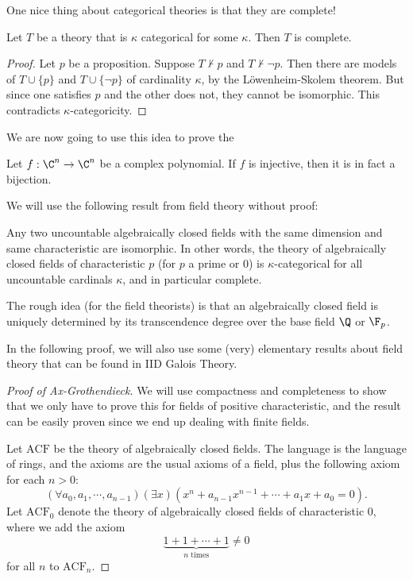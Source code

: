 \documentclass[a4paper]{article}
\begin{document}
\begin{own}
  One nice thing about categorical theories is that they are complete!
  \begin{prop}
    Let $T$ be a theory that is $\kappa$ categorical for some $\kappa$. Then $T$ is complete.
  \end{prop}

  \begin{proof}
    Let $p$ be a proposition. Suppose $T \not\vdash p$ and $T \not\vdash \neg p$. Then there are models of $T \cup \{p\}$ and $T \cup \{\neg p\}$ of cardinality $\kappa$, by the L\"owenheim-Skolem theorem. But since one satisfies $p$ and the other does not, they cannot be isomorphic. This contradicts $\kappa$-categoricity.
  \end{proof}

  We are now going to use this idea to prove the 
  \begin{thm}
    Let $f: \C^n \to \C^n$ be a complex polynomial. If $f$ is injective, then it is in fact a bijection.
  \end{thm}

  We will use the following result from field theory without proof:
  \begin{lemma}
    Any two uncountable algebraically closed fields with the same dimension and same characteristic are isomorphic. In other words, the theory of algebraically closed fields of characteristic $p$ (for $p$ a prime or $0$) is $\kappa$-categorical for all uncountable cardinals $\kappa$, and in particular complete.
  \end{lemma}
  The rough idea (for the field theorists) is that an algebraically closed field is uniquely determined by its transcendence degree over the base field $\Q$ or $\F_p$.

  In the following proof, we will also use some (very) elementary results about field theory that can be found in IID Galois Theory.

  \begin{proof}[Proof of Ax-Grothendieck]
    We will use compactness and completeness to show that we only have to prove this for fields of positive characteristic, and the result can be easily proven since we end up dealing with finite fields.

    Let $\mathrm{ACF}$ be the theory of algebraically closed fields. The language is the language of rings, and the axioms are the usual axioms of a field, plus the following axiom for each $n > 0$:
    \[
      (\forall a_0, a_1, \cdots, a_{n - 1})(\exists x)(x^n + a_{n - 1}x^{n - 1} + \cdots + a_1 x + a_0 = 0).
    \]
    Let $\mathrm{ACF}_0$ denote the theory of algebraically closed fields of characteristic $0$, where we add the axiom
    \[
      \underbrace{1 + 1 + \cdots + 1}_{n\text{ times}} \not= 0\tag{$*$}
    \]
    for all $n$ to $\mathrm{ACF}_n$.


\end{proof}
\end{own}
\end{document}
